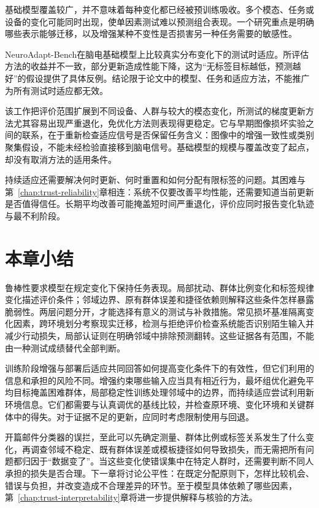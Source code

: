 基础模型覆盖较广，并不意味着每种变化都已经被预训练吸收。多个模态、任务或设备的变化可能同时出现，使单因素测试难以预测组合表现。一个研究重点是明确哪些表示能够迁移，以及增强某种不变性是否损害另一种任务需要的敏感性。

NeuroAdapt-Bench在脑电基础模型上比较真实分布变化下的测试时适应。所评估方法的收益并不一致，部分更新造成性能下降，这为“无标签目标越低，预测越好”的假设提供了具体反例。结论限于论文中的模型、任务和适应方法，不能推广为所有测试时适应都无效。

该工作把评价范围扩展到不同设备、人群与较大的模态变化，所测试的梯度更新方法尤其容易出现严重退化，免优化方法则表现得更稳定。它与早期图像损坏实验之间的联系，在于重新检查适应信号是否保留任务含义：图像中的增强一致性或类别聚集假设，不能未经检验直接移到脑电信号。基础模型的规模与覆盖改变了起点，却没有取消方法的适用条件。

持续适应还需要解决何时更新、何时重置和如何分配有限标签的问题。其困难与第~\ref{chap:trust-reliability}章相连：系统不仅要改善平均性能，还需要知道当前更新是否值得信任。长期平均改善可能掩盖短时间严重退化，评价应同时报告变化轨迹与最不利阶段。

\section{本章小结}
\label{sec:robustness-summary}

鲁棒性要求模型在规定变化下保持任务表现。局部扰动、群体比例变化和标签规律变化描述评价条件；邻域边界、原有群体误差和捷径依赖则解释这些条件怎样暴露脆弱性。两层问题分开，才能选择有意义的测试与补救措施。常见损坏基准隔离变化因素，跨环境划分考察现实迁移，检测与拒绝评价检查系统能否识别陌生输入并减少行动损失，局部认证则在明确邻域中排除预测翻转。这些证据各有范围，不能由一种测试成绩替代全部判断。

训练阶段增强与部署后适应共同回答如何提高变化条件下的有效性，但它们利用的信息和承担的风险不同。增强约束哪些输入应当具有相近行为，最坏组优化避免平均目标掩盖困难群体，局部稳定性训练处理邻域中的边界，而持续适应尝试利用新环境信息。它们都需要与认真调优的基线比较，并检查原环境、变化环境和关键群体中的得失。对于证据不足的更新，应同时考虑限制使用与回退。

开篇邮件分类器的误拦，至此可以先确定测量、群体比例或标签关系发生了什么变化，再调查邻域不稳定、既有群体误差或模板捷径如何导致损失，而无需把所有问题都归因于“数据变了”。当这些变化使错误集中在特定人群时，还需要判断不同人承担的损失是否合理。下一章将讨论公平性：在既定分配原则下，怎样比较机会、错误与负担，并改变造成不合理差异的环节。至于模型具体依赖了哪些因素，第~\ref{chap:trust-interpretability}章将进一步提供解释与核验的方法。

